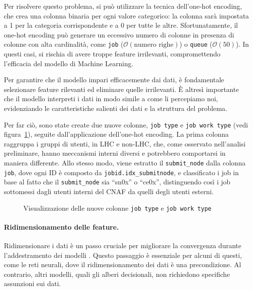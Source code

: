 Per risolvere questo problema, si può utilizzare la tecnica dell'one-hot
encoding, che crea una colonna binaria per ogni valore categorico: la colonna
sarà impostata a 1 per la categoria corrispondente e a 0 per tutte le altre.
Sfortunatamente, il one-hot encoding può generare un eccessivo numero di
colonne in presenza di colonne con alta cardinalità, come \texttt{job}
($\mathcal{O}(\text{numero righe})$) o \texttt{queue} ($\mathcal{O}(50)$). In
questi casi, si rischia di avere troppe feature irrilevanti, compromettendo
l'efficacia del modello di Machine Learning. 

Per garantire che il modello impari efficacemente dai dati, è fondamentale
selezionare feature rilevanti ed eliminare quelle irrilevanti. È altresì
importante che il modello interpreti i dati in modo simile a come li
percepiamo noi, evidenziando le caratteristiche salienti dei dati e la
struttura del problema. 

Per far ciò, sono state create due nuove colonne, \texttt{job type} e
\texttt{job work type} (vedi figura~\ref{fig:job_type_and_job_work_type}),
seguite dall'applicazione dell'one-hot encoding. La prima colonna raggruppa i
gruppi di utenti, in LHC e non-LHC, che, come osservato nell'analisi
preliminare, hanno meccanismi interni diversi e potrebbero comportarsi in
maniera differente. Allo stesso modo, viene estratto il \verb|submit_node|
dalla colonna \texttt{job}, dove ogni ID è composto da
\verb|jobid.idx_submitnode|, e classificato i job in base al fatto che il
\verb|submit_node| sia ``sn0x'' o ``ce0x'', distinguendo così i job sottomessi
dagli utenti interni del CNAF da quelli degli utenti esterni.

\begin{figure}[!ht]
    \centering
    \hspace{2cm}
    \caption{Visualizzazione delle nuove colonne \texttt{job type} e \texttt{job work type}}
    \label{fig:job_type_and_job_work_type}
\end{figure}

\paragraph{Ridimensionamento delle feature.} Ridimensionare i dati è un passo
cruciale per migliorare la convergenza durante l'addestramento dei modelli
\cite{LeCun2012}. Questo passaggio è essenziale per alcuni di questi, come le
reti neurali, dove il ridimensionamento dei dati è una precondizione. Al
contrario, altri modelli, quali gli alberi decisionali, non richiedono
specifiche assunzioni sui dati.

